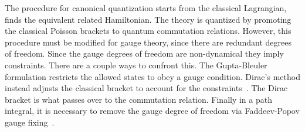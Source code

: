 

The procedure for canonical quantization starts from the classical Lagrangian, finds the equivalent
related Hamiltonian.  The theory is quantized by promoting the classical Poisson brackets to 
quantum commutation relations.  However, this procedure must be modified for gauge theory, 
 since there are redundant degrees of freedom.  Since the gauge degrees of freedom
are non-dynamical they imply constraints.  
There are a couple ways to confront this.
The Gupta-Bleuler formulation restricts the allowed states to obey a gauge condition.  
Dirac's method instead adjusts the classical bracket to account for the constraints~\cite{Dirac1964,Dirac1966}.
The Dirac bracket is what passes over to the commutation relation.
Finally in a path integral, it is necessary to remove the gauge degree of freedom via Faddeev-Popov gauge fixing~\cite{Faddeev1991}.

